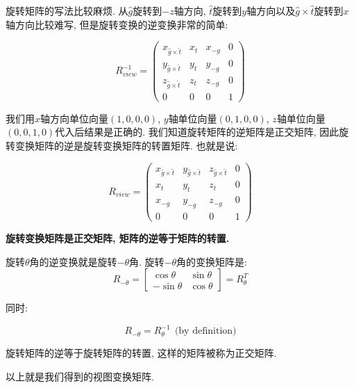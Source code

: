 旋转矩阵的写法比较麻烦. 从$\hat{g}$旋转到$-z$轴方向, $\hat{t}$旋转到$y$轴方向以及$\hat{g}\times\hat{t}$旋转到$x$轴方向比较难写, 但是旋转变换的逆变换非常的简单: 

\begin{equation}
	R^{-1}_{view}=\begin{pmatrix}x_{\hat{g}\times\hat{t}}&x_t&x_{-g}&0\\y_{\hat{g}\times\hat{t}}&y_t&y_{-g}&0\\z_{\hat{g}\times\hat{t}}&z_t&z_{-g}&0\\0&0&0&1\end{pmatrix}
\end{equation}

我们用$x$轴方向单位向量$(1,0,0,0)$, $y$轴单位向量$(0,1,0,0)$, $z$轴单位向量$(0,0,1,0)$代入后结果是正确的. 我们知道旋转矩阵的逆矩阵是正交矩阵, 因此旋转变换矩阵的逆是旋转变换矩阵的转置矩阵. 也就是说: 

\begin{equation}
	R_{view}=\begin{pmatrix}x_{\hat{g}\times\hat{t}}&y_{\hat{g}\times\hat{t}}&z_{\hat{g}\times\hat{t}}&0\\x_t&y_t&z_t&0\\x_{-g}&y_{-g}&z_{-g}&0\\0&0&0&1\end{pmatrix}
\end{equation}

\begin{information}
	\textbf{旋转变换矩阵是正交矩阵, 矩阵的逆等于矩阵的转置. }
	
	旋转$\theta$角的逆变换就是旋转$-\theta$角. 旋转$-\theta$角的变换矩阵是: 
	\begin{equation}
		R_{-\theta}=\begin{bmatrix}\cos\theta&\sin\theta\\-\sin\theta&\cos\theta\end{bmatrix} = R_{\theta}^T
	\end{equation}

	同时: 
	
	\begin{equation}
		R_{-\theta}=R_{\theta}^{-1}\ ~ \text{(by definition)}
	\end{equation}

	旋转矩阵的逆等于旋转矩阵的转置, 这样的矩阵被称为正交矩阵. 

\end{information}

以上就是我们得到的视图变换矩阵. 

